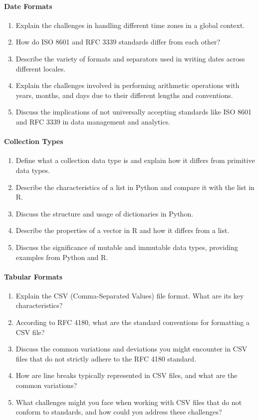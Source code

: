 \paragraph*{Date Formats}
\begin{enumerate}
    \item Explain the challenges in handling different time zones in a global context.
    \item How do ISO 8601 and RFC 3339 standards differ from each other?
    \item Describe the variety of formats and separators used in writing dates across different locales.
    \item Explain the challenges involved in performing arithmetic operations with years, months, and days due to their different lengths and conventions.
    \item Discuss the implications of not universally accepting standards like ISO 8601 and RFC 3339 in data management and analytics.
\end{enumerate}
\begin{withcode}
\paragraph*{Collection Types}
\begin{enumerate}
    \item Define what a collection data type is and explain how it differs from primitive data types.
    \item Describe the characteristics of a list in Python and compare it with the list in R.
    \item Discuss the structure and usage of dictionaries in Python. 
    \item Describe the properties of a vector in R and how it differs from a list.
    \item Discuss the significance of mutable and immutable data types, providing examples from Python and R.
\end{enumerate}
\end{withcode}
\paragraph*{Tabular Formats}
\begin{enumerate}
    \item Explain the CSV (Comma-Separated Values) file format. What are its key characteristics?
    \item According to RFC 4180, what are the standard conventions for formatting a CSV file?
    \item Discuss the common variations and deviations you might encounter in CSV files that do not strictly adhere to the RFC 4180 standard.
    \item How are line breaks typically represented in CSV files, and what are the common variations?
    \item What challenges might you face when working with CSV files that do not conform to standards, and how could you address these challenges?
\end{enumerate}
